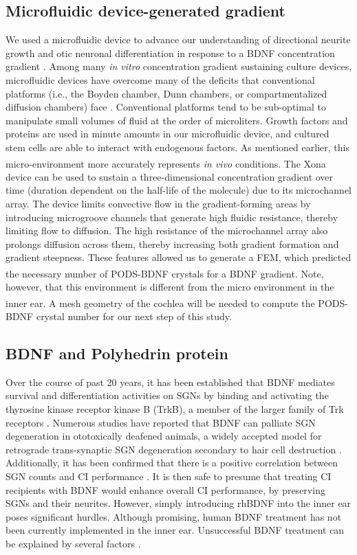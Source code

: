 \documentclass[review]{elsarticle}
\begin{document}
\subsection{Microfluidic device-generated gradient}
We used a microfluidic device to advance our understanding of directional neurite growth and otic neuronal differentiation in response to a BDNF concentration gradient \cite{dravid2020}. Among many \textit{in vitro} concentration gradient sustaining culture devices, microfluidic devices have overcome many of the deficits that conventional platforms (i.e., the Boyden chamber, Dunn chambers, or compartmentalized diffusion chambers) face \cite{dravid2020}. Conventional platforms tend to be sub-optimal to manipulate small volumes of fluid at the order of microliters. Growth factors and proteins are used in minute amounts in our microfluidic device, and cultured stem cells are able to interact with endogenous factors. As mentioned earlier, this micro-environment more accurately represents \textit{in vivo} conditions. The Xona\textsuperscript{\texttrademark} device can be used to sustain a three-dimensional concentration gradient over time (duration dependent on the half-life of the molecule) due to its microchannel array.  The device limits convective flow in the gradient-forming areas by introducing microgroove channels that generate high fluidic resistance, thereby limiting flow to diffusion. The high resistance of the microchannel array also prolongs diffusion across them, thereby increasing both gradient formation and gradient steepness. These features allowed us to generate a FEM, which predicted the necessary number of PODS\textsuperscript{\textregistered}-BDNF crystals for a BDNF gradient. Note, however, that this environment is different from the micro environment in the inner ear. A mesh geometry of the cochlea will be needed to compute the PODS\textsuperscript{\textregistered}-BDNF crystal number for our next step of this study. 

\subsection {BDNF and Polyhedrin protein} 
Over the course of past 20 years, it has been established that BDNF mediates survival and differentiation activities on SGNs by binding and activating the thyrosine kinase receptor kinase B (TrkB), a member of the larger family of Trk receptors \cite{green2012}. Numerous studies have reported that BDNF can palliate SGN degeneration in ototoxically deafened animals, a widely accepted model for retrograde trans-synaptic SGN degeneration secondary to hair cell destruction \cite{Gillespie2003,Pettingill2008,Yamagata2004,Zanin2014}. Additionally, it has been confirmed that there is a positive correlation between SGN counts and CI performance \cite{Seyyedi2014}. It is then safe to presume that treating CI recipients with BDNF would enhance overall CI performance, by preserving SGNs and their neurites. However, simply introducing rhBDNF into the inner ear poses significant hurdles.  Although promising, human BDNF treatment has not been currently implemented in the inner ear. Unsuccessful BDNF treatment can be explained by several factors \cite{Henriques2010}. 
\end{document}
